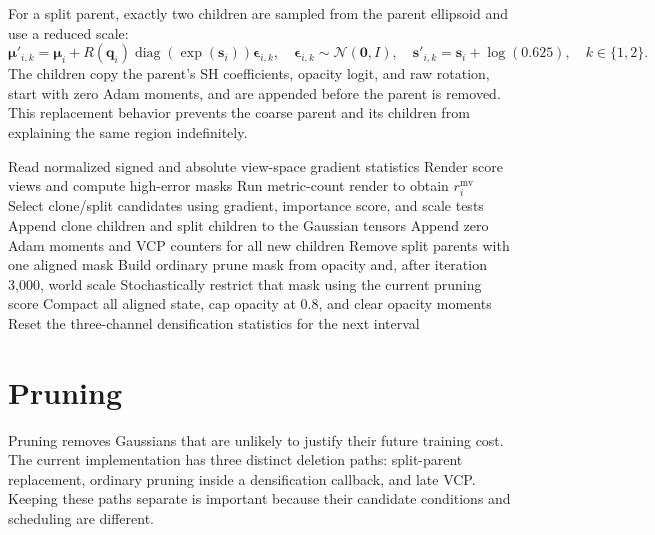 For a split parent, exactly two children are sampled from the parent ellipsoid and use a reduced scale:
\begin{equation}
\boldsymbol{\mu}'_{i,k}
=
\boldsymbol{\mu}_i+
R(\mathbf{q}_i)\operatorname{diag}(\exp(\mathbf{s}_i))\boldsymbol{\epsilon}_{i,k},
\quad
\boldsymbol{\epsilon}_{i,k}\sim\mathcal{N}(\mathbf{0},I),
\quad
\mathbf{s}'_{i,k}=\mathbf{s}_i+\log(0.625),
\quad k\in\{1,2\}.
\end{equation}
The children copy the parent's SH coefficients, opacity logit, and raw rotation, start with zero Adam moments, and are appended before the parent is removed. This replacement behavior prevents the coarse parent and its children from explaining the same region indefinitely.

\begin{algorithm}[H]
\caption{Implemented densification callback}
\label{alg:structure-edit}
\begin{algorithmic}[1]
\STATE Read normalized signed and absolute view-space gradient statistics
\STATE Render score views and compute high-error masks
\STATE Run metric-count render to obtain $r_i^{\mathrm{mv}}$
\STATE Select clone/split candidates using gradient, importance score, and scale tests
\STATE Append clone children and split children to the Gaussian tensors
\STATE Append zero Adam moments and VCP counters for all new children
\STATE Remove split parents with one aligned mask
\STATE Build ordinary prune mask from opacity and, after iteration 3,000, world scale
\STATE Stochastically restrict that mask using the current pruning score
\STATE Compact all aligned state, cap opacity at 0.8, and clear opacity moments
\STATE Reset the three-channel densification statistics for the next interval
\end{algorithmic}
\end{algorithm}

\section{Pruning}

Pruning removes Gaussians that are unlikely to justify their future training cost. The current implementation has three distinct deletion paths: split-parent replacement, ordinary pruning inside a densification callback, and late VCP. Keeping these paths separate is important because their candidate conditions and scheduling are different.

